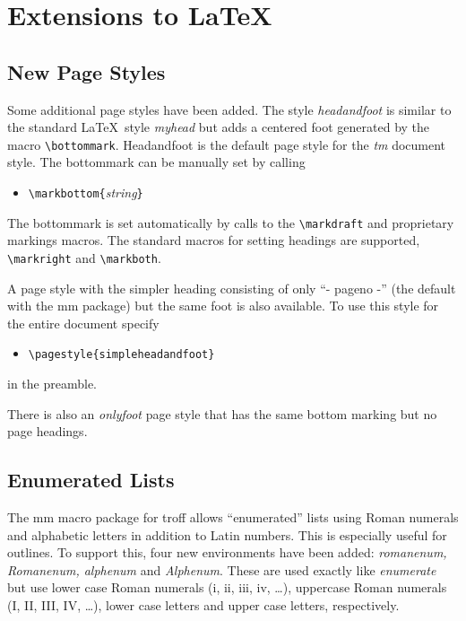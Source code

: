 \section{Extensions to \LaTeX}
\subsection{New Page Styles}
Some additional page styles have been added.  The style {\it
headandfoot} is similar to the standard \LaTeX\ style {\it myhead}
but adds a centered foot generated by the macro \verb|\bottommark|. 
Headandfoot is the default page style for the {\it tm} document style.
The bottommark can be manually set by calling
\begin{itemize}
\item[]
\verb|\markbottom{|{\it string}\verb|}|
\end{itemize}
The bottommark is set automatically by calls to the \verb|\markdraft|
and proprietary markings macros.  The standard macros for setting
headings are supported, \verb|\markright| and \verb|\markboth|.

A page style with the simpler heading consisting of only ``- pageno -''
(the default with the mm package) but the same foot is also available.
To use this style for the entire document specify
\begin{itemize}
\item[]
\verb|\pagestyle{simpleheadandfoot}|
\end{itemize}
in the preamble.

There is also an {\it onlyfoot} page style that has the same bottom
marking but no page headings.
\subsection{Enumerated Lists}
The mm macro package for troff allows ``enumerated'' lists using Roman
numerals and alphabetic letters in addition to Latin numbers.  This
is especially useful for outlines.  To support this, four new
environments have been added:  {\it romanenum, Romanenum, alphenum} and
{\it Alphenum}.  These are used exactly like {\it enumerate} but
use lower case Roman numerals (i, ii, iii, iv, \dots), uppercase
Roman numerals (I, II, III, IV, \dots), lower case letters and upper
case letters, respectively.
